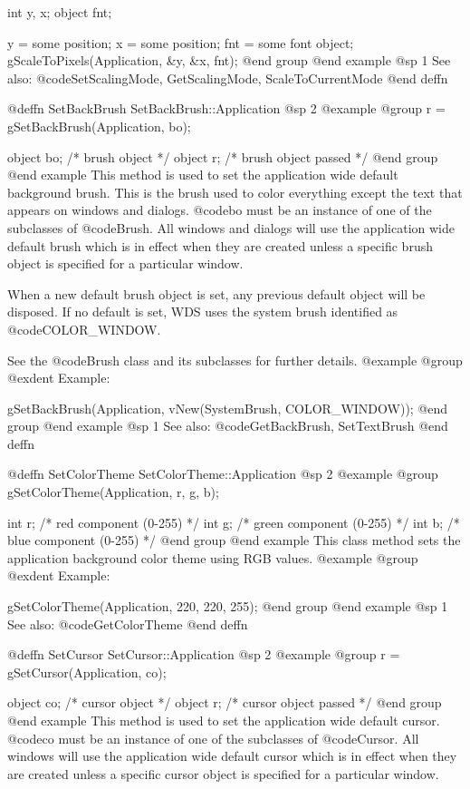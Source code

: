 int     y, x;
object  fnt;

y = some position;
x = some position;
fnt = some font object;
gScaleToPixels(Application, &y, &x, fnt);
@end group
@end example
@sp 1
See also:  @code{SetScalingMode, GetScalingMode, ScaleToCurrentMode}
@end deffn



@deffn {SetBackBrush} SetBackBrush::Application
@sp 2
@example
@group
r = gSetBackBrush(Application, bo);

object  bo;     /*  brush object         */
object  r;      /*  brush object passed  */
@end group
@end example
This method is used to set the application wide default background
brush.  This is the brush used to color everything except the text that
appears on windows and dialogs.  @code{bo} must be an instance of one of
the subclasses of @code{Brush}.  All windows and dialogs will use the
application wide default brush which is in effect when they are created
unless a specific brush object is specified for a particular window.

When a new default brush object is set, any previous default object
will be disposed.  If no default is set, WDS uses the system brush
identified as @code{COLOR_WINDOW}.

See the @code{Brush} class and its subclasses for further details.
@example
@group
@exdent Example:

gSetBackBrush(Application, vNew(SystemBrush, COLOR_WINDOW));
@end group
@end example
@sp 1
See also:  @code{GetBackBrush, SetTextBrush}
@end deffn



@deffn {SetColorTheme} SetColorTheme::Application
@sp 2
@example
@group
gSetColorTheme(Application, r, g, b);

int     r;      /*  red component (0-255)    */
int     g;      /*  green component (0-255)  */
int     b;      /*  blue component (0-255)   */
@end group
@end example
This class method sets the application background color theme using
RGB values.
@example
@group
@exdent Example:

gSetColorTheme(Application, 220, 220, 255);
@end group
@end example
@sp 1
See also:  @code{GetColorTheme}
@end deffn



@deffn {SetCursor} SetCursor::Application
@sp 2
@example
@group
r = gSetCursor(Application, co);

object  co;     /*  cursor object         */
object  r;      /*  cursor object passed  */
@end group
@end example
This method is used to set the application wide default cursor.
@code{co} must be an instance of one of the subclasses of @code{Cursor}.
All windows will use the application wide default cursor which is in
effect when they are created unless a specific cursor object is
specified for a particular window.

